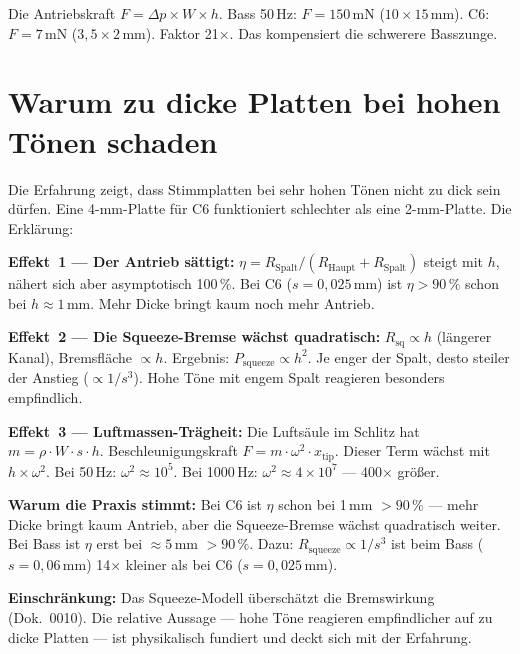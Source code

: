 \documentclass[11pt,a4paper]{article}
\begin{document}
Die Antriebskraft $F = \Delta p \times W \times h$. Bass 50\,Hz: $F = 150$\,mN ($10 \times 15$\,mm). C6: $F = 7$\,mN ($3{,}5 \times 2$\,mm). Faktor 21$\times$. Das kompensiert die schwerere Basszunge.

\section{Warum zu dicke Platten bei hohen Tönen schaden}

Die Erfahrung zeigt, dass Stimmplatten bei sehr hohen Tönen nicht zu dick sein dürfen. Eine 4-mm-Platte für C6 funktioniert schlechter als eine 2-mm-Platte. Die Erklärung:

\textbf{Effekt~1 --- Der Antrieb sättigt:} $\eta = R_\text{Spalt}/(R_\text{Haupt} + R_\text{Spalt})$ steigt mit $h$, nähert sich aber asymptotisch 100\,\%. Bei C6 ($s = 0{,}025$\,mm) ist $\eta > 90\,\%$ schon bei $h \approx 1$\,mm. Mehr Dicke bringt kaum noch mehr Antrieb.

\textbf{Effekt~2 --- Die Squeeze-Bremse wächst quadratisch:} $R_\text{sq} \propto h$ (längerer Kanal), Bremsfläche $\propto h$. Ergebnis: $P_\text{squeeze} \propto h^2$. Je enger der Spalt, desto steiler der Anstieg ($\propto 1/s^3$). Hohe Töne mit engem Spalt reagieren besonders empfindlich.

\textbf{Effekt~3 --- Luftmassen-Trägheit:} Die Luftsäule im Schlitz hat $m = \rho \cdot W \cdot s \cdot h$. Beschleunigungskraft $F = m \cdot \omega^2 \cdot x_\text{tip}$. Dieser Term wächst mit $h \times \omega^2$. Bei 50\,Hz: $\omega^2 \approx 10^5$. Bei 1000\,Hz: $\omega^2 \approx 4 \times 10^7$ --- 400$\times$ größer.

\begin{keybox}
\textbf{Warum die Praxis stimmt:} Bei C6 ist $\eta$ schon bei 1\,mm $> 90\,\%$ --- mehr Dicke bringt kaum Antrieb, aber die Squeeze-Bremse wächst quadratisch weiter. Bei Bass ist $\eta$ erst bei $\approx 5$\,mm $> 90\,\%$. Dazu: $R_\text{squeeze} \propto 1/s^3$ ist beim Bass ($s = 0{,}06$\,mm) 14$\times$ kleiner als bei C6 ($s = 0{,}025$\,mm).
\end{keybox}

\begin{warnbox}
\textbf{Einschränkung:} Das Squeeze-Modell überschätzt die Bremswirkung (Dok.~0010). Die relative Aussage --- hohe Töne reagieren empfindlicher auf zu dicke Platten --- ist physikalisch fundiert und deckt sich mit der Erfahrung.
\end{warnbox}
\end{document}
